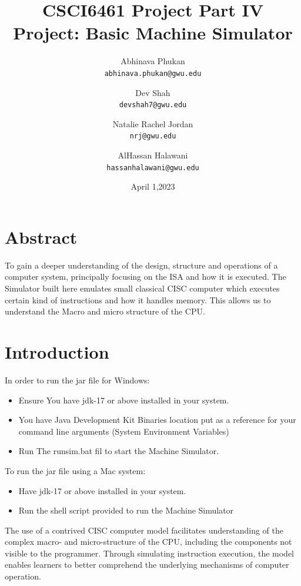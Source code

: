 \documentclass[10pt]{article}
\title{%
  \textbf{\huge CSCI6461 Project Part IV} \\
  \Large Project: Basic Machine Simulator
}
\author{
  Abhinava Phukan\\
  \texttt{abhinava.phukan@gwu.edu}
  \and
  Dev Shah\\
  \texttt{devshah7@gwu.edu}
  \and
  Natalie Rachel Jordan\\
  \texttt{nrj@gwu.edu}
  \and
  AlHassan Halawani\\
  \texttt{hassanhalawani@gwu.edu}
}
\date{April 1,2023}
\begin{document}
\maketitle

\section*{Abstract}
To gain a deeper understanding of the design, structure and operations of a computer
system, principally focusing on the ISA and how it is executed. The Simulator built here
emulates small classical CISC computer which executes certain kind of instructions and how it handles
memory. This allows us to understand the Macro and micro structure of the CPU.

\section{Introduction}\label{section 1}
In order to run the jar file for Windows:\label{windowsetup}
\begin{itemize}[label=--]
  \item Ensure You have jdk-17 or above installed in your system.
  \item You have Java Development Kit Binaries location put as a reference for your command line arguments (System Environment Variables)
  \item Run The runsim.bat fil to start the Machine Simulator.
\end{itemize}
To run the jar file using a Mac system:\label{macsetup}
\begin{itemize}[label=--]
  \item Have jdk-17 or above installed in your system.
  \item Run the shell script provided to run the Machine Simulator
\end{itemize}
The use of a contrived CISC computer model facilitates understanding of the complex macro- 
and micro-structure of the CPU, including the components not visible to the programmer. 
Through simulating instruction execution, the model enables learners to better comprehend 
the underlying mechanisms of computer operation.
\end{document}
